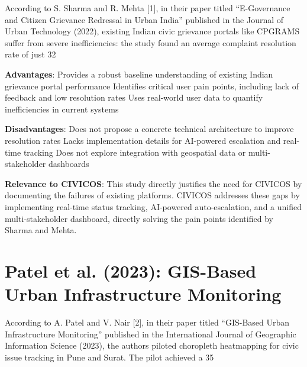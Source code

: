 \documentclass[12pt,a4paper]{report}
\begin{document}
According to S. Sharma and R. Mehta [1], in their paper titled “E-Governance and Citizen Grievance Redressal in Urban India” published in the Journal of Urban Technology (2022), existing Indian civic grievance portals like CPGRAMS suffer from severe inefficiencies: the study found an average complaint resolution rate of just 32%

\textbf{Advantages}:
Provides a robust baseline understanding of existing Indian grievance portal performance
Identifies critical user pain points, including lack of feedback and low resolution rates
Uses real-world user data to quantify inefficiencies in current systems

\textbf{Disadvantages}:
Does not propose a concrete technical architecture to improve resolution rates
Lacks implementation details for AI-powered escalation and real-time tracking
Does not explore integration with geospatial data or multi-stakeholder dashboards

\textbf{Relevance to CIVICOS}: This study directly justifies the need for CIVICOS by documenting the failures of existing platforms. CIVICOS addresses these gaps by implementing real-time status tracking, AI-powered auto-escalation, and a unified multi-stakeholder dashboard, directly solving the pain points identified by Sharma and Mehta.

\section{Patel et al. (2023): GIS-Based Urban Infrastructure Monitoring}

According to A. Patel and V. Nair [2], in their paper titled “GIS-Based Urban Infrastructure Monitoring” published in the International Journal of Geographic Information Science (2023), the authors piloted choropleth heatmapping for civic issue tracking in Pune and Surat. The pilot achieved a 35%
\end{document}
